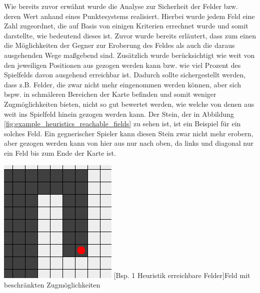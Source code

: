 \documentclass[12pt,a4paper,bibliography=totocnumbered,listof=totocnumbered]{article}
\begin{document}
Wie bereits zuvor erwähnt wurde die Analyse zur Sicherheit der Felder bzw. deren Wert anhand eines Punktesystems realisiert. Hierbei wurde jedem Feld eine Zahl zugeordnet, die auf Basis von einigen Kriterien errechnet wurde und somit darstellte, wie bedeutend dieses ist. Zuvor wurde bereits erläutert, dass zum einen die Möglichkeiten der Gegner zur Eroberung des Feldes als auch die daraus ausgehenden Wege maßgebend sind. Zusätzlich wurde berücksichtigt wie weit von den jeweiligen Positionen aus gezogen werden kann bzw. wie viel Prozent des Spielfelds davon ausgehend erreichbar ist. Dadurch sollte sichergestellt werden, dass z.B. Felder, die zwar nicht mehr eingenommen werden können, aber sich bspw. in schmäleren Bereichen der Karte befinden und somit weniger Zugmöglichkeiten bieten, nicht so gut bewertet werden, wie welche von denen aus weit ins Spielfeld hinein gezogen werden kann. Der Stein, der in Abbildung \ref{fig:example_heuristics_reachable_fields} zu sehen ist, ist ein Beispiel für ein solches Feld. Ein gegnerischer Spieler kann diesen Stein zwar nicht mehr erobern, aber gezogen werden kann von hier aus nur nach oben, da links und diagonal nur ein Feld bis zum Ende der Karte ist.

\vspace{1em}
\begin{minipage}{\linewidth}
	\centering
	\includegraphics[width=0.5\linewidth]{pics/heuristics_reachable_fields.png}
	[Bsp. 1 Heuristik erreichbare Felder]{Feld mit beschränkten Zugmöglichkeiten}
	\label{fig:example_heuristics_reachable_fields}
\end{minipage}
\\
\end{document}
